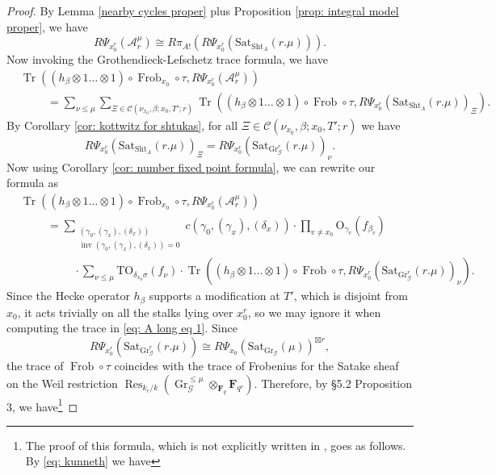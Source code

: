 \documentclass[reqno]{amsart}
\numberwithin{equation}{section}
\newcommand{\F}{\mathbf{F}}
\newcommand{\Cal}[1]{\mathcal{#1}}
\newcommand{\mrm}[1]{\mathrm{#1}}
\DeclareMathOperator{\Frob}{Frob}
\DeclareMathOperator{\Tr}{Tr}
\DeclareMathOperator{\Res}{Res}
\DeclareMathOperator{\Gr}{Gr}
\DeclareMathOperator{\inv}{inv}
\DeclareMathOperator{\Sht}{Sht}
\theoremstyle{remark}
\numberwithin{equation}{section}
\begin{document}
\begin{proof}
By Lemma \ref{nearby cycles proper} plus Proposition \ref{prop: integral model proper}, we have 
\[
R\Psi_{x_0^r}(\Cal{A}_r^{\mu}) \cong  R\pi_{A!} (R\Psi_{x_0^r}(\mrm{Sat}_{\Sht_A}(r.\mu))).
\]
Now invoking the Grothendieck-Lefschetz trace formula, we have 
\begin{align*}
&\Tr(( h_{\beta} \otimes 1 \ldots \otimes 1 ) \circ \Frob_{x_0} \circ  \tau , R\Psi_{x_0^r}(\Cal{A}_r^{\mu})) \\
&\hspace{1cm} = \sum_{\nu \leq \mu} \sum_{\Xi \in \Cal{C}(\nu_{x_0}, \beta; x_0,T'; r)}  \Tr(( h_{\beta} \otimes 1 \ldots \otimes 1 ) \circ \Frob \circ  \tau , R\Psi_{x_0^r}(\mrm{Sat}_{\Sht_A}(r.\mu))_{\Xi}).
\end{align*}
By Corollary \ref{cor: kottwitz for shtukas}, for all $\Xi\in \Cal{C}(\nu_{x_0}, \beta; x_0,T'; r)$ we have 
\[
R\Psi_{x_0^r}(\mrm{Sat}_{\Sht_A}(r.\mu))_{\Xi}  = R\Psi_{x_0^r} (\mrm{Sat}_{\Gr_{\Cal{G}}^r}(r.\mu))_{\nu}.
\]
Now using Corollary \ref{cor: number fixed point formula}, we can rewrite our formula as
\begin{align}\label{eq: A long eq 1}
&\Tr(( h_{\beta} \otimes 1 \ldots \otimes 1 ) \circ \Frob_{x_0} \circ  \tau , R\Psi_{x_0^r}(\Cal{A}_r^{\mu}))  \nonumber \\ 
& \hspace{1cm} =  \sum_{\substack{ (\gamma_0, (\gamma_x),(\delta_x)) \\ \inv(\gamma_0, (\gamma_x),(\delta_x) ) = 0  }} 
c(\gamma_0, (\gamma_x), (\delta_x))   \cdot \prod_{v \neq x_0} \mrm{O}_{\gamma_v}(f_{\beta_v})  \nonumber \\
&\hspace{2cm} \cdot 	\sum_{\nu \leq \mu}  \mrm{TO}_{\delta_{x_0} \sigma}(f_{\nu})  \cdot \Tr(( h_{\beta} \otimes 1 \ldots \otimes 1 ) \circ \Frob \circ  \tau , R\Psi_{x_0^r} (\mrm{Sat}_{\Gr_{\Cal{G}}^r}(r.\mu))_{\nu}).
\end{align}
Since the Hecke operator $h_{\beta}$ supports a modification at $T'$, which is disjoint from $x_0$, it acts trivially on all the stalks lying over $x_0^r$, so we may ignore it when computing the trace in \eqref{eq: A long eq 1}. Since
\begin{equation}\label{eq: kunneth}
R\Psi_{x_0^r} (\mrm{Sat}_{\Gr_{\Cal{G}}^r}(r.\mu)) \cong R\Psi_{x_0}(\mrm{Sat}_{\Gr_{\Cal{G}}}(\mu))^{\boxtimes r},
\end{equation}
the trace of $\Frob \circ \tau$ coincides with the trace of Frobenius for the Satake sheaf on the Weil restriction $\Res_{k_r/k}( \Gr_{\Cal{G}}^{\leq \mu} \otimes_{\F_q} \F_{q^r})$. Therefore, by \cite{Ngo06} \S 5.2  Proposition 3, we have\footnote{The proof of this formula, which is not explicitly written in \cite{Ngo06}, goes as follows. By \eqref{eq: kunneth} we have 
}
\end{proof}
\end{document}
